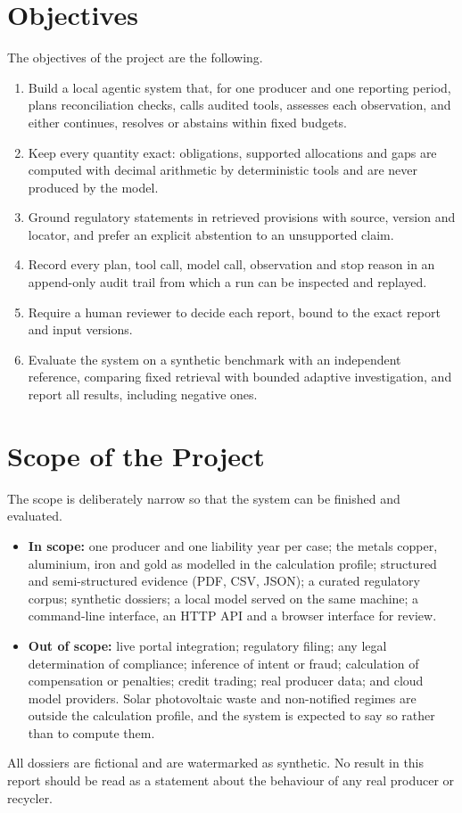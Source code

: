\section{Objectives}
The objectives of the project are the following.
\begin{enumerate}[itemsep=2pt]
\item Build a local agentic system that, for one producer and one reporting period, plans reconciliation
      checks, calls audited tools, assesses each observation, and either continues, resolves or abstains
      within fixed budgets.
\item Keep every quantity exact: obligations, supported allocations and gaps are computed with decimal
      arithmetic by deterministic tools and are never produced by the model.
\item Ground regulatory statements in retrieved provisions with source, version and locator, and prefer
      an explicit abstention to an unsupported claim.
\item Record every plan, tool call, model call, observation and stop reason in an append-only audit trail
      from which a run can be inspected and replayed.
\item Require a human reviewer to decide each report, bound to the exact report and input versions.
\item Evaluate the system on a synthetic benchmark with an independent reference, comparing fixed
      retrieval with bounded adaptive investigation, and report all results, including negative ones.
\end{enumerate}

\section{Scope of the Project}
\label{sec:scope}
The scope is deliberately narrow so that the system can be finished and evaluated.
\begin{itemize}[itemsep=2pt]
\item \textbf{In scope:} one producer and one liability year per case; the metals copper, aluminium, iron
      and gold as modelled in the calculation profile; structured and semi-structured evidence (PDF,
      CSV, JSON); a curated regulatory corpus; synthetic dossiers; a local model served on the same machine;
      a command-line interface, an HTTP API and a browser interface for review.
\item \textbf{Out of scope:} live portal integration; regulatory filing; any legal determination of
      compliance; inference of intent or fraud; calculation of compensation or penalties; credit trading;
      real producer data; and cloud model providers. Solar photovoltaic waste and non-notified regimes are
      outside the calculation profile, and the system is expected to say so rather than to compute them.
\end{itemize}
All dossiers are fictional and are watermarked as synthetic. No result in this report should be read as a
statement about the behaviour of any real producer or recycler.

